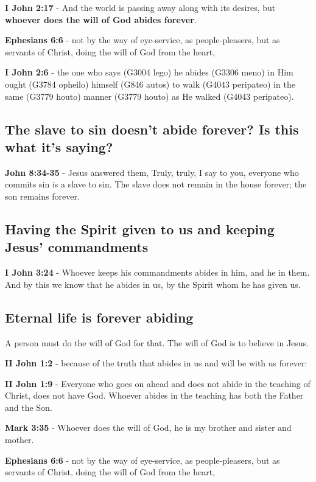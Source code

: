 \documentclass[11pt]{article}
\begin{document}
\textbf{I John 2:17} - And the world is passing away along with its desires, but \textbf{whoever does the will of God abides forever}.

\textbf{Ephesians 6:6} - not by the way of eye-service, as people-pleasers, but as servants of Christ, doing the will of God from the heart,

\textbf{I John 2:6} - the one who says (G3004 lego) he abides (G3306 meno) in Him ought (G3784 opheilo) himself (G846 autos) to walk (G4043 peripateo) in the same (G3779 houto) manner (G3779 houto) as He walked (G4043 peripateo).

\subsection{The slave to sin doesn't abide forever? Is this what it's saying?}
\label{sec:org1082cde}
\textbf{John 8:34-35} - Jesus answered them, Truly, truly, I say to you, everyone who commits sin is a slave to sin. The slave does not remain in the house forever; the son remains forever.

\subsection{Having the Spirit given to us and keeping Jesus' commandments}
\label{sec:org8b78134}
\textbf{I John 3:24} - Whoever keeps his commandments abides in him, and he in them. And by this we know that he abides in us, by the Spirit whom he has given us.

\subsection{Eternal life is forever abiding}
\label{sec:orgc808fd7}
A person must do the will of God for that.
The will of God is to believe in Jesus.

\textbf{II John 1:2} - because of the truth that abides in us and will be with us forever:

\textbf{II John 1:9} - Everyone who goes on ahead and does not abide in the teaching of Christ, does not have God. Whoever abides in the teaching has both the Father and the Son.

\textbf{Mark 3:35} - Whoever does the will of God, he is my brother and sister and mother.

\textbf{Ephesians 6:6} - not by the way of eye-service, as people-pleasers, but as servants of Christ, doing the will of God from the heart,
\end{document}
